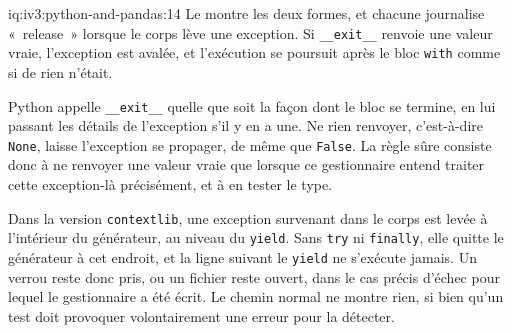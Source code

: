 \begin{solution}{iq:iv3:python-and-pandas:14}
Le  montre les deux formes, et chacune journalise «~release~» lorsque le corps lève une exception. Si \texttt{\_\_exit\_\_} renvoie une valeur vraie, l'exception est avalée, et l'exécution se poursuit après le bloc \texttt{with} comme si de rien n'était.
\label{lst:iv3:pp:context}

Python appelle \texttt{\_\_exit\_\_} quelle que soit la façon dont le bloc se termine, en lui passant les détails de l'exception s'il y en a une. Ne rien renvoyer, c'est-à-dire \texttt{None}, laisse l'exception se propager, de même que \texttt{False}. La règle sûre consiste donc à ne renvoyer une valeur vraie que lorsque ce gestionnaire entend traiter cette exception-là précisément, et à en tester le type.

Dans la version \texttt{contextlib}, une exception survenant dans le corps est levée à l'intérieur du générateur, au niveau du \texttt{yield}. Sans \texttt{try} ni \texttt{finally}, elle quitte le générateur à cet endroit, et la ligne suivant le \texttt{yield} ne s'exécute jamais. Un verrou reste donc pris, ou un fichier reste ouvert, dans le cas précis d'échec pour lequel le gestionnaire a été écrit. Le chemin normal ne montre rien, si bien qu'un test doit provoquer volontairement une erreur pour la détecter.

\end{solution}

